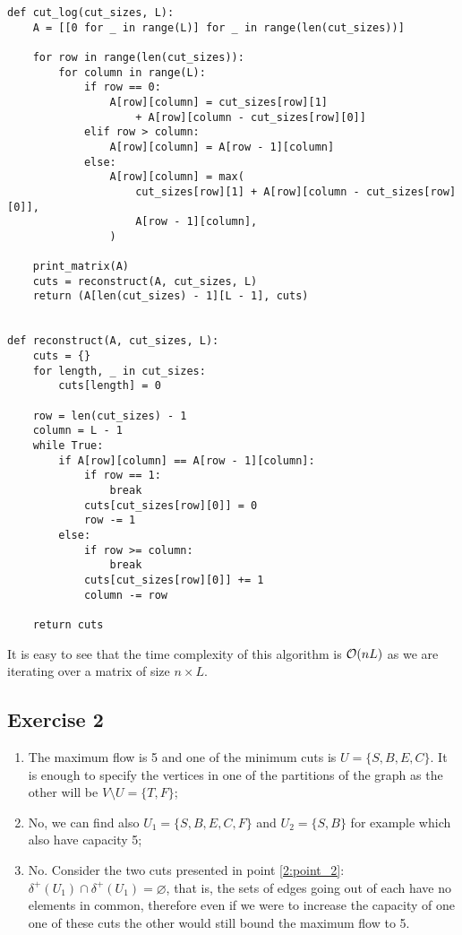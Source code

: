 \documentclass[12pt]{extarticle}
\begin{document}
\begin{verbatim}
def cut_log(cut_sizes, L):
    A = [[0 for _ in range(L)] for _ in range(len(cut_sizes))]

    for row in range(len(cut_sizes)):
        for column in range(L):
            if row == 0:
                A[row][column] = cut_sizes[row][1] 
                    + A[row][column - cut_sizes[row][0]]
            elif row > column:
                A[row][column] = A[row - 1][column]
            else:
                A[row][column] = max(
                    cut_sizes[row][1] + A[row][column - cut_sizes[row][0]],
                    A[row - 1][column],
                )

    print_matrix(A)
    cuts = reconstruct(A, cut_sizes, L)
    return (A[len(cut_sizes) - 1][L - 1], cuts)


def reconstruct(A, cut_sizes, L):
    cuts = {}
    for length, _ in cut_sizes:
        cuts[length] = 0

    row = len(cut_sizes) - 1
    column = L - 1
    while True:
        if A[row][column] == A[row - 1][column]:
            if row == 1:
                break
            cuts[cut_sizes[row][0]] = 0
            row -= 1
        else:
            if row >= column:
                break
            cuts[cut_sizes[row][0]] += 1
            column -= row

    return cuts
\end{verbatim}

It is easy to see that the time complexity of this algorithm is $\mathcal{O}(nL)$ as we are iterating over a matrix of size $n \times L$.

\subsection*{Exercise 2}

\begin{enumerate}
    \item The maximum flow is 5 and one of the minimum cuts is $U = \{S, B, E, C\}$. It is enough to specify the vertices in one of the partitions of the graph as the other will be $V\setminus U = \{T, F\}$;
    \item No, we can find also $U_1 = \{S, B, E, C,F\}$ and $U_2 = \{S, B\}$ for example which also have capacity 5; \label{2:point_2}
    \item No. Consider the two cuts presented in point \ref{2:point_2}: $\delta^+(U_1) \cap \delta^+(U_1) = \varnothing$, that is, the sets of edges going out of each have no elements in common,
          therefore even if we were to increase the capacity of one one of these cuts the other would still bound the maximum flow to 5.
\end{enumerate}
\end{document}
